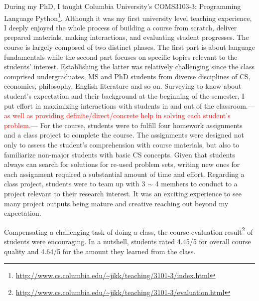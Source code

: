 \documentclass[letterpaper, 10pt]{article}
\newcommand{\jikk}[1]{{---\textcolor{red}{#1}---}}
\newcommand{\jikk}[1]{}
\begin{document}
\begin{small}
During my PhD, I taught Columbia University's COMS3103-3: Programming Language
Python\footnote{\url{http://www.cs.columbia.edu/~jikk/teaching/3101-3/index.html}}.
%
%
Although it was my first university level teaching experience, I deeply enjoyed
the whole process of building a course from scratch, deliver prepared
materials, making interactions, and evaluating student progresses.
% 
The course is largely composed of two distinct phases. The first part is about
language fundamentals while the second part focuses on specific topics relevant
to the students' interest. Establishing the latter was relatively challenging
since the class comprised undergraduates, MS and PhD students from diverse
disciplines of CS, economics, philosophy, English literature and so on.
%
Surveying to know about student's expectation and their background at the
beginning of the semester, I put effort in maximizing interactions with
students in and out of the classroom.\jikk{as well as providing
definite/direct/concrete help in solving each student's problem.}
% 
For the course, students were to fulfill four homework assignments and a class
project to complete the course. 
%
The assignments were designed not only to assess the student's comprehension
with course materials, but also to familiarize non-major students with basic CS
concepts.
%
%
Given that students always can search for solutions for re-used problem sets,
writing new ones for each assignment required a substantial amount of time and
effort. 
%
Regarding a class project, students were to team up with 3 $\sim$ 4 members to
conduct to a project relevant to their research interest.
%
It was an exciting experience to see many project outputs being mature and
creative reaching out beyond my expectation.
%
%

Compensating a challenging task of doing a class, the course evaluation
result\footnote{\url{http://www.cs.columbia.edu/~jikk/teaching/3101-3/evaluation.html}}
of students were encouraging. In a nutshell, students rated 4.45/5 for
overall course quality and 4.64/5 for the amount they learned from the class.

\vspace{-2pt}

\end{small}
\end{document}
